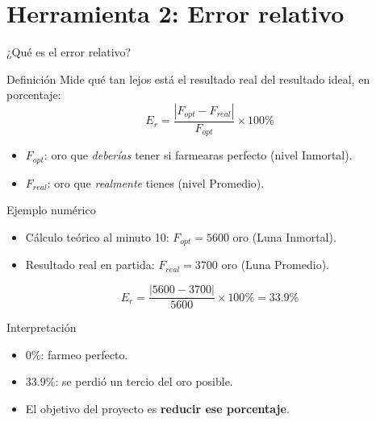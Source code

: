 \section{Herramienta 2: Error relativo}

\begin{frame}{¿Qué es el error relativo?}
  \begin{block}{Definición}
    Mide qué tan lejos está el resultado real del resultado ideal, en porcentaje:
    \[
      E_r = \frac{|F_{opt} - F_{real}|}{F_{opt}} \times 100\%
    \]
  \end{block}
  \vspace{0.5em}
  \begin{itemize}
    \item \(F_{opt}\): oro que \textit{deberías} tener si farmearas perfecto (nivel Inmortal).
    \item \(F_{real}\): oro que \textit{realmente} tienes (nivel Promedio).
  \end{itemize}
\end{frame}

\begin{frame}{Ejemplo numérico}
  \begin{itemize}
    \item Cálculo teórico al minuto 10: \(F_{opt} = 5600\) oro (Luna Inmortal).
    \item Resultado real en partida: \(F_{real} = 3700\) oro (Luna Promedio).
  \end{itemize}
  \vspace{0.5em}
  \[
    E_r = \frac{|5600 - 3700|}{5600} \times 100\% = 33.9\%
  \]
  \vspace{0.5em}
  \begin{block}{Interpretación}
    \begin{itemize}
      \item \(0\%\): farmeo perfecto.
      \item \(33.9\%\): se perdió un tercio del oro posible.
      \item El objetivo del proyecto es \textbf{reducir ese porcentaje}.
    \end{itemize}
  \end{block}
\end{frame}

